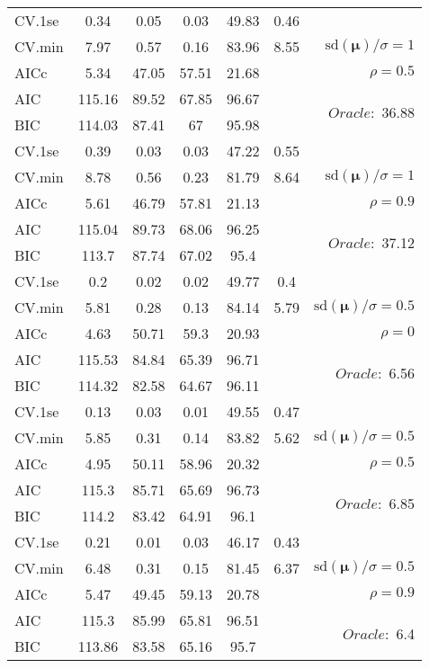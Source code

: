 \begin{table}
\begin{center}
\begin{tabular}{l*{5}{c}|r}
 \hline 
CV.1se & 0.34 & 0.05 & 0.03 & 49.83 & 0.46 & \\
CV.min & 7.97 & 0.57 & 0.16 & 83.96 & 8.55 &  $\mathrm{sd}(\mathbf{\mu})/\sigma=1$ \\
AICc & 5.34 & 47.05 & 57.51 & 21.68 & & $\rho=0.5$ \\
AIC & 115.16 & 89.52 & 67.85 & 96.67 & &  \multirow{2}{*}{$Oracle: $ 36.88} \\
BIC & 114.03 & 87.41 & 67 & 95.98 & &  \\
 \hline 
CV.1se & 0.39 & 0.03 & 0.03 & 47.22 & 0.55 & \\
CV.min & 8.78 & 0.56 & 0.23 & 81.79 & 8.64 &  $\mathrm{sd}(\mathbf{\mu})/\sigma=1$ \\
AICc & 5.61 & 46.79 & 57.81 & 21.13 & & $\rho=0.9$ \\
AIC & 115.04 & 89.73 & 68.06 & 96.25 & &  \multirow{2}{*}{$Oracle: $ 37.12} \\
BIC & 113.7 & 87.74 & 67.02 & 95.4 & &  \\
 \hline 
CV.1se & 0.2 & 0.02 & 0.02 & 49.77 & 0.4 & \\
CV.min & 5.81 & 0.28 & 0.13 & 84.14 & 5.79 &  $\mathrm{sd}(\mathbf{\mu})/\sigma=0.5$ \\
AICc & 4.63 & 50.71 & 59.3 & 20.93 & & $\rho=0$ \\
AIC & 115.53 & 84.84 & 65.39 & 96.71 & &  \multirow{2}{*}{$Oracle: $ 6.56} \\
BIC & 114.32 & 82.58 & 64.67 & 96.11 & &  \\
 \hline 
CV.1se & 0.13 & 0.03 & 0.01 & 49.55 & 0.47 & \\
CV.min & 5.85 & 0.31 & 0.14 & 83.82 & 5.62 &  $\mathrm{sd}(\mathbf{\mu})/\sigma=0.5$ \\
AICc & 4.95 & 50.11 & 58.96 & 20.32 & & $\rho=0.5$ \\
AIC & 115.3 & 85.71 & 65.69 & 96.73 & &  \multirow{2}{*}{$Oracle: $ 6.85} \\
BIC & 114.2 & 83.42 & 64.91 & 96.1 & &  \\
 \hline 
CV.1se & 0.21 & 0.01 & 0.03 & 46.17 & 0.43 & \\
CV.min & 6.48 & 0.31 & 0.15 & 81.45 & 6.37 &  $\mathrm{sd}(\mathbf{\mu})/\sigma=0.5$ \\
AICc & 5.47 & 49.45 & 59.13 & 20.78 & & $\rho=0.9$ \\
AIC & 115.3 & 85.99 & 65.81 & 96.51 & &  \multirow{2}{*}{$Oracle: $ 6.4} \\
BIC & 113.86 & 83.58 & 65.16 & 95.7 & &  \\
 \hline 
\end{tabular}
\end{center}
\vspace{-1cm}
\end{table}





